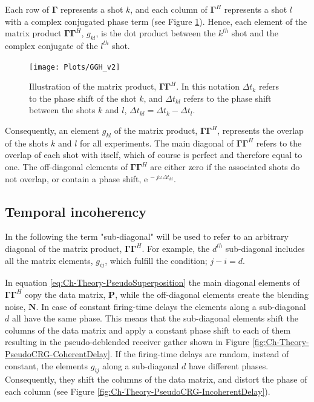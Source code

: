 Each row of $\mathbf{\Gamma}$ represents a shot $k$, and each column of $\mathbf{\Gamma}^H$ represents a shot $l$ with a complex conjugated phase term (see Figure \ref{fig:Ch-Theory-GGH}). Hence, each element of the matrix product $\mathbf{\Gamma \Gamma}^H$, $g_{kl}$, is the dot product between the $k^{th}$ shot and the complex conjugate of the $l^{th}$ shot.

\begin{figure}
	\centering
	\texttt{[image: Plots/GGH\_v2]}
	\caption{Illustration of the matrix product, $\mathbf{\Gamma \Gamma}^H$. In this notation $\Delta t_k$ refers to the phase shift of the shot $k$, and $\Delta t_{kl}$ refers to the phase shift between the shots $k$ and $l$, $\Delta t_{kl} = \Delta t_k - \Delta t_l$.}
	\label{fig:Ch-Theory-GGH}
\end{figure}

Consequently, an element $g_{kl}$ of the matrix product, $\mathbf{\Gamma \Gamma}^H$, represents the overlap of the shots $k$ and $l$ for all experiments. The main diagonal of $\mathbf{\Gamma \Gamma}^H$ refers to the overlap of each shot with itself, which of course is perfect and therefore equal to one. The off-diagonal elements of $\mathbf{\Gamma \Gamma}^H$ are either zero if the associated shots do not overlap, or contain a phase shift, $\mathrm{e}^{\, -j \omega \Delta t_{kl}}$.

\subsection*{Temporal incoherency}

In the following the term "sub-diagonal" will be used to refer to an arbitrary diagonal of the matrix product, $\mathbf{\Gamma \Gamma}^H$. For example, the $d^{th}$ sub-diagonal includes all the matrix elements, $g_{ij}$, which fulfill the condition; $j -i = d$.

In equation \ref{eq:Ch-Theory-PseudoSuperposition} the main diagonal elements of $\mathbf{\Gamma \Gamma}^H$ copy the data matrix, $\mathbf{P}$, while the off-diagonal elements create the blending noise, $\mathbf{N}$. In case of constant firing-time delays the elements along a sub-diagonal $d$ all have the same phase. This means that the sub-diagonal elements shift the columns of the data matrix and apply a constant phase shift to each of them resulting in the pseudo-deblended receiver gather shown in Figure \ref{fig:Ch-Theory-PseudoCRG-CoherentDelay}. If the firing-time delays are random, instead of constant, the elements $g_{ij}$ along a sub-diagonal $d$ have different phases. Consequently, they shift the columns of the data matrix, and distort the phase of each column (see Figure \ref{fig:Ch-Theory-PseudoCRG-IncoherentDelay}). 

